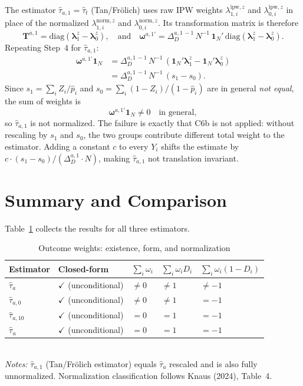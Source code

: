 \documentclass[12pt, a4paper]{article}
\theoremstyle{condstyle}
\theoremstyle{plain}
\newcommand{\bone}{\mathbf{1}_N}
\newcommand{\that}[1]{\hat{\tau}_{#1}}
\newcommand{\phat}{\hat{p}}
\begin{document}
The estimator $\that{a,1} = \that{t}$ (Tan/Frölich) uses raw IPW weights
$\lambda_{1,i}^{\mathrm{ipw},z}$ and $\lambda_{0,i}^{\mathrm{ipw},z}$ in place of
the normalized $\lambda_{1,i}^{\mathrm{norm},z}$ and $\lambda_{0,i}^{\mathrm{norm},z}$.
Its transformation matrix is therefore
\[
  \mathbf{T}^{a,1} = \mathrm{diag}(\boldsymbol{\lambda}_1^z - \boldsymbol{\lambda}_0^z),
  \quad\text{and}\quad
  \boldsymbol{\omega}^{a,1\prime}
  = \Delta_D^{a,1\,-1}\,N^{-1}\,\bone'\,\mathrm{diag}(\boldsymbol{\lambda}_1^z - \boldsymbol{\lambda}_0^z).
\]
Repeating Step~4 for $\that{a,1}$:
\begin{align*}
  \boldsymbol{\omega}^{a,1\prime}\bone
  &= \Delta_D^{a,1\,-1}\,N^{-1}\,(\bone'\boldsymbol{\lambda}_1^z - \bone'\boldsymbol{\lambda}_0^z)\\
  &= \Delta_D^{a,1\,-1}\,N^{-1}\,(s_1 - s_0).
\end{align*}
Since $s_1 = \sum_i Z_i/\phat_i$ and $s_0 = \sum_i (1-Z_i)/(1-\phat_i)$
are in general \emph{not equal}, the sum of weights is
\[
  \boldsymbol{\omega}^{a,1\prime}\bone \neq 0 \quad\text{in general},
\]
so $\that{a,1}$ is not normalized.
The failure is exactly that C6b is not applied: without rescaling by $s_1$ and $s_0$,
the two groups contribute different total weight to the estimator.
Adding a constant $c$ to every $Y_i$ shifts the estimate by $c\cdot(s_1-s_0)/(\Delta_D^{a,1}\cdot N)$,
making $\that{a,1}$ not translation invariant.

\section{Summary and Comparison}
\label{sec:summary}

Table~\ref{tab:summary} collects the results for all three estimators.

\begin{table}[h!]
\centering
\caption{Outcome weights: existence, form, and normalization}
\label{tab:summary}
\renewcommand{\arraystretch}{1.4}
\begin{tabular}{@{}lllll@{}}
\toprule
Estimator & Closed-form & $\sum_i\omega_i$ & $\sum_i\omega_iD_i$ & $\sum_i\omega_i(1-D_i)$ \\
\midrule
$\that{a}$    & $\checkmark$ (unconditional) & $\neq 0$ & $\neq 1$ & $\neq -1$ \\
$\that{a,0}$  & $\checkmark$ (unconditional) & $\neq 0$ & $\neq 1$ & $= -1$    \\
$\that{a,10}$ & $\checkmark$ (unconditional) & $= 0$    & $= 1$    & $= -1$    \\
$\that{u}$    & $\checkmark$ (unconditional) & $= 0$    & $= 1$    & $= -1$    \\
\bottomrule
\end{tabular}\\[4pt]
\small\textit{Notes:} $\that{a,1}$ (Tan/Frölich estimator) equals $\that{a}$ rescaled and is also fully unnormalized.
Normalization classification follows Knaus (2024), Table~4.
\end{table}
\end{document}
